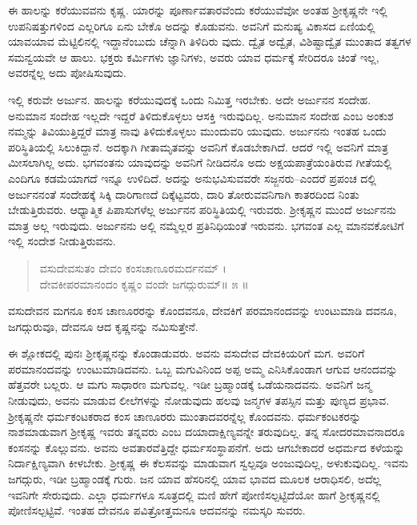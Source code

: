 ಈ ಹಾಲನ್ನು ಕರೆಯುವವನು ಕೃಷ್ಣ. ಯಾರನ್ನು ಪೂರ್ಣಾವತಾರವೆಂದು ಕರೆಯುವೆವೋ ಅಂತಹ ಶ್ರೀಕೃಷ್ಣನೇ ಇಲ್ಲಿ ಉಪನಿಷತ್ತುಗಳಿಂದ ಎಲ್ಲರಿಗೂ ಏನು ಬೇಕೊ ಅದನ್ನು ಕೊಡುವನು. ಅವನಿಗೆ ಮನುಷ್ಯ ವಿಕಾಸದ ಏಣಿಯಲ್ಲಿ ಯಾವಯಾವ ಮೆಟ್ಟಿಲಿನಲ್ಲಿ ಇದ್ದಾನೆಂಬುದು ಚೆನ್ನಾಗಿ ತಿಳಿದಿರು ವುದು. ದ್ವೈತ ಅದ್ವೈತ, ವಿಶಿಷ್ಟಾದ್ವೈತ ಮುಂತಾದ ತತ್ವಗಳ ಸಮನ್ವಯವೇ ಆ ಹಾಲು. ಭಕ್ತರು ಕರ್ಮಿಗಳು ಜ್ಞಾನಿಗಳು, ಅವರು ಯಾವ ಧರ್ಮಕ್ಕೆ ಸೇರಿದರೂ ಚಿಂತೆ ಇಲ್ಲ, ಅವರನ್ನೆಲ್ಲ ಅದು ಪೋಷಿಸುವುದು.

ಇಲ್ಲಿ ಕರುವೇ ಅರ್ಜುನ. ಹಾಲನ್ನು ಕರೆಯುವುದಕ್ಕೆ ಒಂದು ನಿಮಿತ್ತ ಇರಬೇಕು. ಅದೇ ಅರ್ಜುನನ ಸಂದೇಹ. ಅನುಮಾನ ಸಂದೇಹ ಇಲ್ಲದೇ ಇದ್ದರೆ ತಿಳಿದುಕೊಳ್ಳಲು ಆಸಕ್ತಿ ಇರುವುದಿಲ್ಲ. ಅನುಮಾನ ಸಂದೇಹ ಎಂಬ ಅಂಕುಶ ನಮ್ಮನ್ನು ತಿವಿಯುತ್ತಿದ್ದರೆ ಮಾತ್ರ ನಾವು ತಿಳಿದುಕೊಳ್ಳಲು ಮುಂದುವರಿ ಯುವುದು. ಅರ್ಜುನನು ಇಂತಹ ಒಂದು ಪರಿಸ್ಥಿತಿಯಲ್ಲಿ ಸಿಲುಕಿದ್ದಾನೆ. ಅದಕ್ಕಾಗಿ ಗೀತಾಮೃತವನ್ನು ಅವನಿಗೆ ಕೊಡಬೇಕಾಗಿದೆ. ಆದರೆ ಇಲ್ಲಿ ಅವನಿಗೆ ಮಾತ್ರ ಮೀಸಲಾಗಿಲ್ಲ ಅದು. ಭಗವಂತನು ಯಾವುದನ್ನು ಅವನಿಗೆ ನೀಡಿದನೊ ಅದು ಅಕ್ಷಯಪಾತ್ರೆಯಂತಿರುವ ಗೀತೆಯಲ್ಲಿ ಎಂದಿಗೂ ಕಡಮೆಯಾಗದೆ ಇನ್ನೂ ಉಳಿದಿದೆ. ಅದನ್ನು ಅನುಭವಿಸುವವರೇ ಸಜ್ಜನರು–ಎಂದರೆ ಪ್ರಪಂಚ ದಲ್ಲಿ ಅರ್ಜುನನಂತೆ ಸಂದೇಹಕ್ಕೆ ಸಿಕ್ಕಿ ದಾರಿಗಾಣದೆ ದಿಕ್ಕೆಟ್ಟವರು, ದಾರಿ ತೋರುವವನಿಗಾಗಿ ಕಾತರದಿಂದ ನಿಂತು ಬೇಡುತ್ತಿರುವರು. ಆಧ್ಯಾತ್ಮಿಕ ಪಿಪಾಸುಗಳೆಲ್ಲ ಅರ್ಜುನನ ಪರಿಸ್ಥಿತಿಯಲ್ಲಿ ಇರುವರು. ಶ್ರೀಕೃಷ್ಣನ ಮುಂದೆ ಅರ್ಜುನನು ಮಾತ್ರ ಅಲ್ಲ ಇರುವುದು. ಅರ್ಜುನನು ಅಲ್ಲಿ ನಮ್ಮೆಲ್ಲರ ಪ್ರತಿನಿಧಿಯಂತೆ ಇರುವನು. ಭಗವಂತ ಎಲ್ಲ ಮಾನವಕೋಟಿಗೆ ಇಲ್ಲಿ ಸಂದೇಶ ನೀಡುತ್ತಿರುವನು.

\begin{verse}
ವಸುದೇವಸುತಂ ದೇವಂ ಕಂಸಚಾಣೂರಮರ್ದನಮ್ ।\\ದೇವಕೀಪರಮಾನಂದಂ ಕೃಷ್ಣಂ ವಂದೇ ಜಗದ್ಗುರುಮ್\num{॥ ೫ ॥}
\end{verse}

{\small ವಸುದೇವನ ಮಗನೂ ಕಂಸ ಚಾಣೂರರನ್ನು ಕೊಂದವನೂ, ದೇವಕಿಗೆ ಪರಮಾನಂದವನ್ನು ಉಂಟುಮಾಡಿ ದವನೂ, ಜಗದ್ಗುರುವೂ, ದೇವನೂ ಆದ ಕೃಷ್ಣನನ್ನು ನಮಿಸುತ್ತೇನೆ.}

ಈ ಶ್ಲೋಕದಲ್ಲಿ ಪುನಃ ಶ್ರೀಕೃಷ್ಣನನ್ನು ಕೊಂಡಾಡುವರು. ಅವನು ವಸುದೇವ ದೇವಕಿಯರಿಗೆ ಮಗ. ಅವರಿಗೆ ಪರಮಾನಂದವನ್ನು ಉಂಟುಮಾಡಿದವನು. ಒಬ್ಬ ಮಗುವಿನಿಂದ ಅಪ್ಪ ಅಮ್ಮ ಎನಿಸಿಕೊಂಡಾಗ ಆಗುವ ಆನಂದವನ್ನು ಹೆತ್ತವರೇ ಬಲ್ಲರು. ಆ ಮಗು ಸಾಧಾರಣ ಮಗುವಲ್ಲ. ಇಡೀ ಬ್ರಹ್ಮಾಂಡಕ್ಕೆ ಒಡೆಯನಾದವನು. ಅವನಿಗೆ ಜನ್ಮ ನೀಡುವುದು, ಅವನು ಮಾಡುವ ಲೀಲೆಗಳನ್ನು ನೋಡುವುದು ಹಲವು ಜನ್ಮಗಳ ತಪಸ್ಸಿನ ಮತ್ತು ಪುಣ್ಯದ ಪ್ರಭಾವ. ಶ್ರೀಕೃಷ್ಣನೇ ಧರ್ಮಕಂಟಕರಾದ ಕಂಸ ಚಾಣೂರರು ಮುಂತಾದವರನ್ನೆಲ್ಲ ಕೊಂದವನು. ಧರ್ಮಕಂಟಕರನ್ನು ನಾಶಮಾಡುವಾಗ ಶ್ರೀಕೃಷ್ಣ ಇವರು ತನ್ನವರು ಎಂಬ ದಯಾದಾಕ್ಷಿಣ್ಯವನ್ನೇ ತರುವುದಿಲ್ಲ. ತನ್ನ ಸೋದರಮಾವನಾದರೂ ಕಂಸನನ್ನು ಕೊಲ್ಲುವನು. ಅವನು ಅವತಾರವೆತ್ತಿದ್ದೇ ಧರ್ಮಸಂಸ್ಥಾಪನೆಗೆ. ಅದು ಆಗಬೇಕಾದರೆ ಅಧರ್ಮದ ಕಳೆಯನ್ನು ನಿರ್ದಾಕ್ಷಿಣ್ಯವಾಗಿ ಕೀಳಬೇಕು. ಶ್ರೀಕೃಷ್ಣ ಈ ಕೆಲಸವನ್ನು ಮಾಡುವಾಗ ಸ್ವಲ್ಪವೂ ಅಂಜುವುದಿಲ್ಲ, ಅಳುಕುವುದಿಲ್ಲ. ಇವನು ಜಗದ್ಗುರು, ಇಡೀ ಬ್ರಹ್ಮಾಂಡಕ್ಕೆ ಗುರು. ಜನ ಯಾವ ಹೆಸರಿನಲ್ಲಿ ಯಾವ ಭಾವದ ಮೂಲಕ ಆರಾಧಿಸಲಿ, ಅದೆಲ್ಲ ಇವನಿಗೇ ಸೇರುವುದು. ಎಲ್ಲಾ ಧರ್ಮಗಳೂ ಸೂತ್ರದಲ್ಲಿ ಮಣಿ ಹೇಗೆ ಪೋಣಿಸಲ್ಪಟ್ಟಿದೆಯೋ ಹಾಗೆ ಶ್ರೀಕೃಷ್ಣನಲ್ಲಿ ಪೋಣಿಸಲ್ಪಟ್ಟಿವೆ. ಇಂತಹ ದೇವನೂ ಪವಿತ್ರೋತ್ತಮನೂ ಆದವನನ್ನು ನಮಸ್ಕರಿ ಸುವರು.

